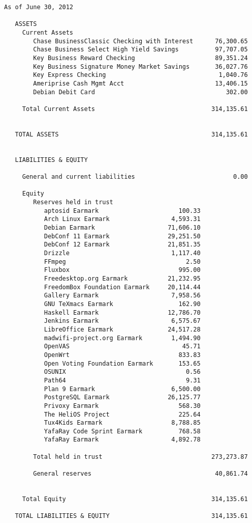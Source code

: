 \documentclass[letterpaper]{report}
\begin{document}
\begin{verbatim}
As of June 30, 2012

   ASSETS
     Current Assets
        Chase BusinessClassic Checking with Interest      76,300.65
        Chase Business Select High Yield Savings          97,707.05
        Key Business Reward Checking                      89,351.24
        Key Business Signature Money Market Savings       36,027.76
        Key Express Checking                               1,040.76
        Ameriprise Cash Mgmt Acct                         13,406.15
        Debian Debit Card                                    302.00

     Total Current Assets                                314,135.61


   TOTAL ASSETS                                          314,135.61


   LIABILITIES & EQUITY

     General and current liabilities                           0.00

     Equity
        Reserves held in trust
           aptosid Earmark                      100.33
           Arch Linux Earmark                 4,593.31
           Debian Earmark                    71,606.10
           DebConf 11 Earmark                29,251.50
           DebConf 12 Earmark                21,851.35
           Drizzle                            1,117.40
           FFmpeg                                 2.50
           Fluxbox                              995.00
           Freedesktop.org Earmark           21,232.95
           FreedomBox Foundation Earmark     20,114.44
           Gallery Earmark                    7,958.56
           GNU TeXmacs Earmark                  162.90
           Haskell Earmark                   12,786.70
           Jenkins Earmark                    6,575.67
           LibreOffice Earmark               24,517.28
           madwifi-project.org Earmark        1,494.90
           OpenVAS                               45.71
           OpenWrt                              833.83
           Open Voting Foundation Earmark       153.65
           OSUNIX                                 0.56
           Path64                                 9.31
           Plan 9 Earmark                     6,500.00
           PostgreSQL Earmark                26,125.77
           Privoxy Earmark                      568.30
           The HeliOS Project                   225.64
           Tux4Kids Earmark                   8,788.85
           YafaRay Code Sprint Earmark          768.58
           YafaRay Earmark                    4,892.78

        Total held in trust                              273,273.87

        General reserves                                  40,861.74


     Total Equity                                        314,135.61

   TOTAL LIABILITIES & EQUITY                            314,135.61
\end{verbatim}
\end{document}
